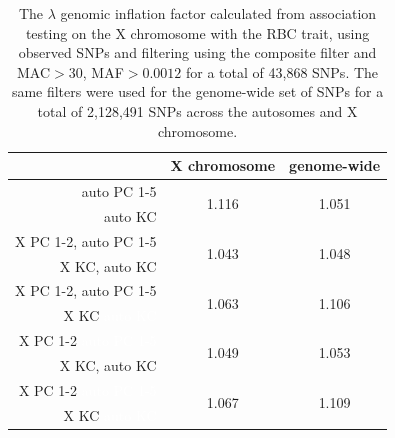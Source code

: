 \documentclass[11pt]{article} %
\begin{document}
\begin{table}[h!]
\centering
\begin{tabular}{r|cc}
  \hline
 & X chromosome & genome-wide \\ 
  \hline
auto PC 1-5 & \multirow{2}{*}{1.116} & \multirow{2}{*}{1.051} \\ 
auto KC & & \\ \hline
X PC 1-2, auto PC 1-5&\multirow{2}{*}{1.043} & \multirow{2}{*}{1.048} \\ 
X KC, auto KC & & \\ \hline
X PC 1-2, auto PC 1-5 & \multirow{2}{*}{1.063} & \multirow{2}{*}{1.106} \\
X KC \textcolor{white}{auto KC} & & \\ \hline
X PC 1-2 \textcolor{white}{auto PC 1-5}& \multirow{2}{*}{1.049} & \multirow{2}{*}{1.053} \\
X KC, auto KC & & \\ \hline
X PC 1-2 \textcolor{white}{auto PC 1-5} & \multirow{2}{*}{1.067} & \multirow{2}{*}{1.109} \\
X KC \textcolor{white}{auto KC} & & \\ \hline 
\end{tabular}
\caption{The $\lambda$ genomic inflation factor calculated from association testing on the X chromosome with the RBC trait, using observed SNPs and filtering using the composite filter and MAC$>$30, MAF$>0.0012$ for a total of 43,868 SNPs. The same filters were used for the genome-wide set of SNPs for a total of 2,128,491 SNPs across the autosomes and X chromosome.}
\label{table:lambda}
\end{table}
\end{document}
